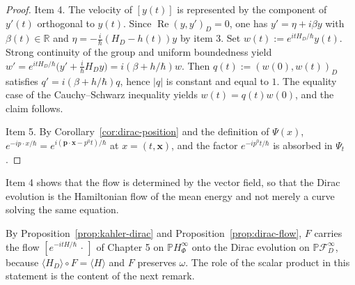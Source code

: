 \begin{proof}
	Item 4. The velocity of $[y(t)]$ is represented by the component of $y'(t)$ orthogonal to $y(t)$. Since $\operatorname{Re}(y,y')_D=0$, one has $y'=\eta+i\beta y$ with $\beta(t)\in\mathbb{R}$ and $\eta=-\tfrac{i}{\hbar}(H_D-h(t))y$ by item 3. Set $w(t):=e^{itH_D/\hbar}y(t)$. Strong continuity of the group and uniform boundedness yield $w'=e^{itH_D/\hbar}\big(y'+\tfrac{i}{\hbar}H_Dy\big)=i(\beta+h/\hbar)w$. Then $q(t):=(w(0),w(t))_D$ satisfies $q'=i(\beta+h/\hbar)q$, hence $|q|$ is constant and equal to $1$. The equality case of the Cauchy--Schwarz inequality yields $w(t)=q(t)w(0)$, and the claim follows.
	
	Item 5. By Corollary~\ref{cor:dirac-position} and the definition of $\Psi(x)$, $e^{-ip\cdot x/\hbar}=e^{i(\mathbf{p}\cdot\mathbf{x}-p^0t)/\hbar}$ at $x=(t,\mathbf{x})$, and the factor $e^{-ip^0t/\hbar}$ is absorbed in $\Psi_t$.
\end{proof}

\noindent Item 4 shows that the flow is determined by the vector field, so that the Dirac evolution is the Hamiltonian flow of the mean energy and not merely a curve solving the same equation.

By Proposition~\ref{prop:kahler-dirac} and Proposition~\ref{prop:dirac-flow}, $F$ carries the flow $[e^{-itH/\hbar}\,\cdot\,]$ of Chapter 5 on $\mathbb{P}H^\infty_\Phi$ onto the Dirac evolution on $\mathbb{P}\mathcal{F}_D^\infty$, because $\langle H_D\rangle\circ F=\langle H\rangle$ and $F$ preserves $\omega$. The role of the scalar product in this statement is the content of the next remark.

